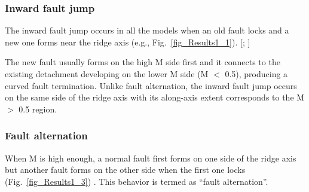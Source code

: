 \subsubsection{Inward fault jump}
The inward fault jump occurs in all the models when an old fault locks and a new one forms near the ridge axis (e.g., Fig.~\hyperref[fig_Results1_1]{\ref{fig_Results1_1}}).
[\citealp{Lavier2000}; \citealp{Olive2014}]

The new fault usually forms on the high M side first and it connects to the existing detachment developing on the lower M side (M $<$ 0.5), producing a curved fault termination. Unlike fault alternation, the inward fault jump occurs on the same side of the ridge axis with its along-axis extent corresponds to the M $>$ 0.5 region. %

\subsubsection{Fault alternation}
When M is high enough, a normal fault first forms on one side of the ridge axis but another fault forms on the other side when the first one locks (Fig.~\hyperref[fig_Results1_3]{\ref{fig_Results1_3}}) \citep{Buck2005,Tucholke2008}. This behavior is termed as ``fault alternation''. %

